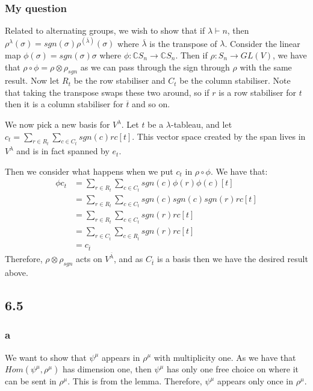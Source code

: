 \documentclass[]{article}
\begin{document}
\subsubsection*{My question}
Related to alternating groups, we wish to show that if $\lambda \vdash n$, then $\rho^\lambda(\sigma) = sgn(\sigma) \rho^{(\overline{\lambda})}(\sigma)$ where $\overline{\lambda}$ is the transpose of $\lambda$.
Consider the linear map $\phi(\sigma) = sgn(\sigma) \sigma$ where $\phi : \mathbb{C}S_n \rightarrow \mathbb{C} S_n$. Then if $\rho : S_n \rightarrow GL(V)$, we have that $\rho \circ \phi = \rho \otimes \rho_{sgn}$ as we can pass through the sign through $\rho$ with the same result.
Now let $R_t$ be the row stabiliser and $C_t$ be the column stabiliser. Note that taking the transpose swaps these two around, so if $r$ is a row stabiliser for $t$ then it is a column stabiliser for $\overline{t}$ and so on. 

We now pick a new basis for $V^\lambda$. Let $t$ be a $\lambda$-tableau, and let $c_t = \sum_{r \in R_t} \sum_{c \in C_t} sgn(c) r c[t]$. This vector space created by the span lives in $V^\lambda$ and is in fact spanned by $e_t$. 

Then we consider what happens when we put $c_t$ in $\rho \circ \phi$. We have that:
\begin{align*}
	\phi c_t &= \sum_{r \in R_t} \sum_{c \in C_t} sgn(c) \phi(r) \phi(c) [t]\\
	&= \sum_{r \in R_t} \sum_{c \in C_t} sgn(c) sgn(c) sgn(r) r c [t]\\
	&= \sum_{r \in R_t} \sum_{c \in C_t} sgn(r) r c [t]\\
	&= \sum_{r \in C_{\overline{t}}} \sum_{c \in R_{\overline{t}}} sgn(r) r c [t]\\
	&= c_{\overline{t}}
\end{align*}
Therefore, $\rho \otimes \rho_{sgn}$ acts on $V^{\overline{\lambda}}$, and as $C_{\overline{t}}$ is a basis then we have the desired result above. 

\subsection*{6.5}
\subsubsection*{a}
We want to show that $\psi^\mu$ appears in $\rho^\mu$ with multiplicity one. As we have that $Hom(\psi^\mu, \rho^\mu)$ has dimension one, then $\psi^\mu$ has only one free choice on where it can be sent in $\rho^\mu$. This is from the lemma. Therefore, $\psi^\mu$ appears only once in $\rho^\mu$. 
\end{document}
